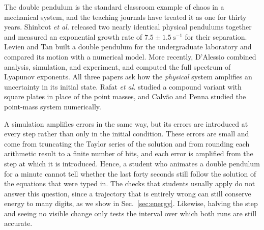 \documentclass[prb,reprint,amsmath,amssymb,longbibliography]{revtex4-1}
\begin{document}
The double pendulum is the standard classroom example of chaos in a mechanical
system, and the teaching journals have treated it as one for thirty years.
Shinbrot \textit{et al.}\cite{shinbrot1992} released two nearly identical
physical pendulums together and measured an exponential growth rate of
$7.5\pm1.5~\mathrm{s^{-1}}$ for their separation. Levien and
Tan\cite{levien1993} built a double pendulum for the undergraduate laboratory
and compared its motion with a numerical model. More recently,
D'Alessio\cite{dalessio2023} combined analysis, simulation, and experiment, and
computed the full spectrum of Lyapunov exponents. All three papers ask how the
\emph{physical} system amplifies an uncertainty in its initial state. Rafat
\textit{et al.}\cite{rafat2009} studied a compound variant with square plates
in place of the point masses, and Calv\~ao and Penna\cite{calvao2015} studied
the point-mass system numerically.

A simulation amplifies errors in the same way, but its errors are introduced at
every step rather than only in the initial condition. These errors are small and
come from truncating the Taylor series of the solution and from rounding each
arithmetic result to a finite number of bits, and each error is amplified from
the step at which it is introduced. Hence, a student who animates a double
pendulum for a minute cannot tell whether the last forty seconds still follow
the solution of the equations that were typed in. The checks that students
usually apply do not answer this question, since a trajectory that is entirely
wrong can still conserve energy to many digits, as we show in
Sec.~\ref{sec:energy}. Likewise, halving the step and seeing no visible change
only tests the interval over which both runs are still accurate.
\end{document}
